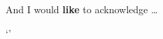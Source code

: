 
\begin{acknowledgements}      


And I would \textbf{like} to acknowledge \dots


\end{acknowledgements}
    `'